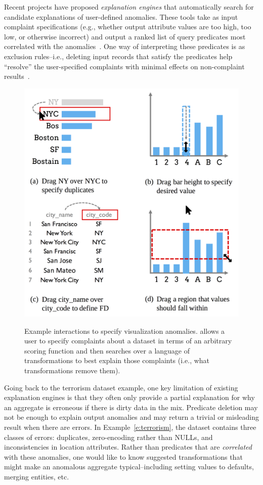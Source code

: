 Recent projects have proposed \emph{explanation engines} that automatically search for candidate explanations of user-defined anomalies.  These tools take as input complaint specifications (e.g., whether output attribute values are too high, too low, or otherwise incorrect) and output a ranked list of query predicates most correlated with the anomalies~\cite{scorpion,DBLP:conf/sigmod/ChalamallaIOP14,bailis2016macrobase,roy2015explaining}.  One way of interpreting these predicates is as exclusion rules--i.e., deleting input records that satisfy the predicates help ``resolve'' the user-specified complaints with minimal effects on non-complaint results~\cite{scorpion}.  

\begin{figure}[tb]
\centering
\includegraphics[width=.8\columnwidth]{figures/ui.png}
\label{f:ui}
\caption{Example interactions to specify visualization anomalies. \sys allows a user to specify complaints about a dataset in terms of an arbitrary scoring function and then searches over a language of transformations to best explain those complaints (i.e., what transformations remove them).}
\end{figure}

Going back to the terrorism dataset example, one key limitation of existing explanation engines is that they often only provide a partial explanation for why an aggregate is erroneous if there is dirty data in the mix. Predicate deletion may not be enough to explain output anomalies and may return a trivial or misleading result when there are errors. In Example~\ref{e:terrorism}, the dataset contains three classes of errors:  duplicates, zero-encoding rather than NULLs, and inconsistencies in location attributes. Rather than predicates that are \emph{correlated} with these anomalies, one would like to know suggested transformations that might make an anomalous aggregate typical--including setting values to defaults, merging entities, etc. 


